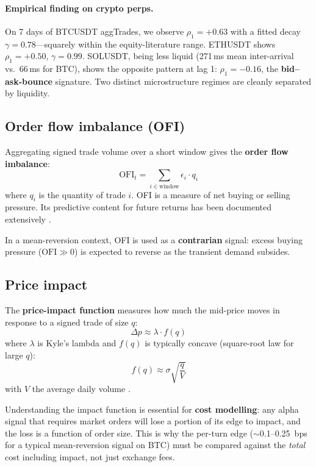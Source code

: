 \documentclass[11pt,a4paper]{article}
\begin{document}
\paragraph{Empirical finding on crypto perps.}
On 7 days of BTCUSDT aggTrades, we observe $\rho_1 = +0.63$ with a
fitted decay $\gamma = 0.78$---squarely within the equity-literature
range. ETHUSDT shows $\rho_1 = +0.50$, $\gamma = 0.99$. SOLUSDT, being
less liquid (271\,ms mean inter-arrival vs.\ 66\,ms for BTC), shows the
opposite pattern at lag 1: $\rho_1 = -0.16$, the \textbf{bid--ask-bounce}
signature. Two distinct microstructure regimes are cleanly separated by
liquidity.

\subsection{Order flow imbalance (OFI)}

Aggregating signed trade volume over a short window gives the
\textbf{order flow imbalance}:
\begin{equation}
  \mathrm{OFI}_t = \sum_{i \in \text{window}} \epsilon_i \cdot q_i
\end{equation}
where $q_i$ is the quantity of trade $i$. OFI is a measure of net
buying or selling pressure. Its predictive content for future returns
has been documented extensively
\citep{cont2014price, cartea2015algorithmic}.

In a mean-reversion context, OFI is used as a \textbf{contrarian}
signal: excess buying pressure ($\mathrm{OFI} \gg 0$) is expected to
reverse as the transient demand subsides.

\subsection{Price impact}
\label{sec:impact}

The \textbf{price-impact function} measures how much the mid-price
moves in response to a signed trade of size $q$:
\begin{equation}
  \Delta p \approx \lambda \cdot f(q)
\end{equation}
where $\lambda$ is Kyle's lambda \citep{kyle1985continuous} and $f(q)$
is typically concave (square-root law for large $q$):
\begin{equation}
  f(q) \approx \sigma \sqrt{\frac{q}{V}}
\end{equation}
with $V$ the average daily volume \citep{bouchaud2009markets,
almgren2005direct}.

Understanding the impact function is essential for \textbf{cost
modelling}: any alpha signal that requires market orders will lose
a portion of its edge to impact, and the loss is a function of order
size. This is why the per-turn edge ($\sim$0.1--0.25~bps for a typical
mean-reversion signal on BTC) must be compared against the \emph{total}
cost including impact, not just exchange fees.
\end{document}
